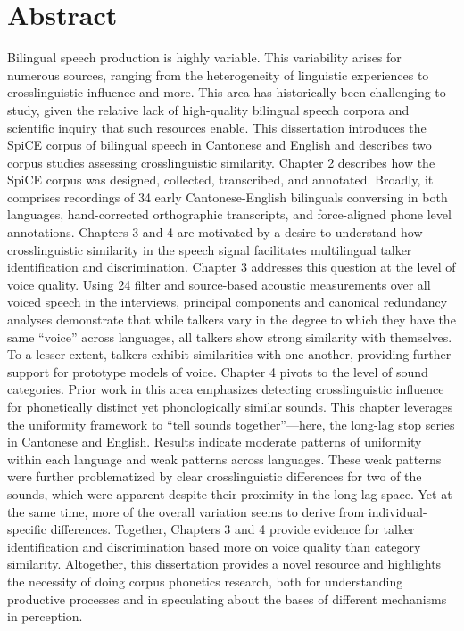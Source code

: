 
\chapter{Abstract}

Bilingual speech production is highly variable. This variability arises for numerous sources, ranging from the heterogeneity of linguistic experiences to crosslinguistic influence and more. This area has historically been challenging to study, given the relative lack of high-quality bilingual speech corpora and scientific inquiry that such resources enable. This dissertation introduces the SpiCE corpus of bilingual speech in Cantonese and English and describes two corpus studies assessing crosslinguistic similarity. Chapter 2 describes how the SpiCE corpus was designed, collected, transcribed, and annotated. Broadly, it comprises recordings of 34 early Cantonese-English bilinguals conversing in both languages, hand-corrected orthographic transcripts, and force-aligned phone level annotations. Chapters 3 and 4 are motivated by a desire to understand how crosslinguistic similarity in the speech signal facilitates multilingual talker identification and discrimination. Chapter 3 addresses this question at the level of voice quality. Using 24 filter and source-based acoustic measurements over all voiced speech in the interviews, principal components and canonical redundancy analyses demonstrate that while talkers vary in the degree to which they have the same ``voice'' across languages, all talkers show strong similarity with themselves. To a lesser extent, talkers exhibit similarities with one another, providing further support for prototype models of voice. Chapter 4 pivots to the level of sound categories. Prior work in this area emphasizes detecting crosslinguistic influence for phonetically distinct yet phonologically similar sounds. This chapter leverages the uniformity framework to ``tell sounds together''---here, the long-lag stop series in Cantonese and English.  Results indicate moderate patterns of uniformity within each language and weak patterns across languages. These weak patterns were further problematized by clear crosslinguistic differences for two of the sounds, which were apparent despite their proximity in the long-lag space. Yet at the same time, more of the overall variation seems to derive from individual-specific differences. Together, Chapters 3 and 4 provide evidence for talker identification and discrimination based more on voice quality than category similarity. Altogether, this dissertation provides a novel resource and highlights the necessity of doing corpus phonetics research, both for understanding productive processes and in speculating about the bases of different mechanisms in perception. 


\endinput %

